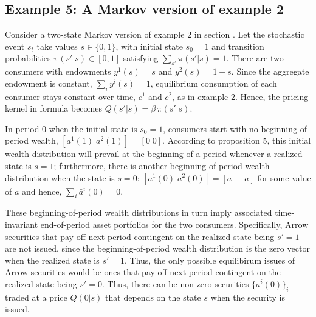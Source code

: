 \subsection{Example 5: A Markov version of 
                           example 2}\label{sec:example5}%
Consider a two-state Markov version of example 2 in 
section .
Let the stochastic event $s_t$ take values 
$s\in\{0,1\}$, 
with initial state $s_0=1$ and transition 
probabilities $\pi(s'\vert s)\in [0,1]$
satisfying $\sum_{s'} \pi(s'\vert s)=1$.
There are two consumers with endowments $y^1(s)=s$ and 
$y^2(s)=1-s$. Since the aggregate endowment is constant,
$\sum_i y^i(s)=1$, equilibrium consumption of each
consumer stays constant over time, 
$\bar c^1$ and $\bar c^2$, as in example 2. Hence, 
the pricing kernel in formula  becomes
$Q(s'|s) = \beta \,\pi(s'|s)$.

In period 0 when the initial state is $s_0=1$,  
consumers start with no beginning-of-period wealth, 
$[\bar a^1(1)\; \bar a^2(1)] = [0\; 0]$.
According to proposition 5, this initial wealth
distribution will prevail at the beginning of
a period whenever a realized state is $s=1$;  furthermore, 
there is another beginning-of-period wealth
distribution when the state is $s=0$:
$[\bar a^1(0)\; \bar a^2(0)] = [a\; -\!a]$ 
for some value of $a$ and hence,
$\sum_{i} \bar a^i(0) =0$.

These beginning-of-period wealth distributions in
turn imply associated time-invariant end-of-period 
asset portfolios for  the two consumers. 
Specifically,  Arrow
securities that pay off next period contingent on 
the realized state being $s'=1$ are not  issued, since the 
beginning-of-period wealth distribution is the 
zero vector when the realized state is $s'=1$.
Thus, the only possible equilibirum issues of Arrow
securities would be ones that pay off next period
contingent on the realized state being $s'=0$. Thus, there can be non zero
securities $\{\bar a^i(0)\}_i$ traded  at a price 
$Q(0 | s)$ that depends on the 
state $s$ when the security is issued.

